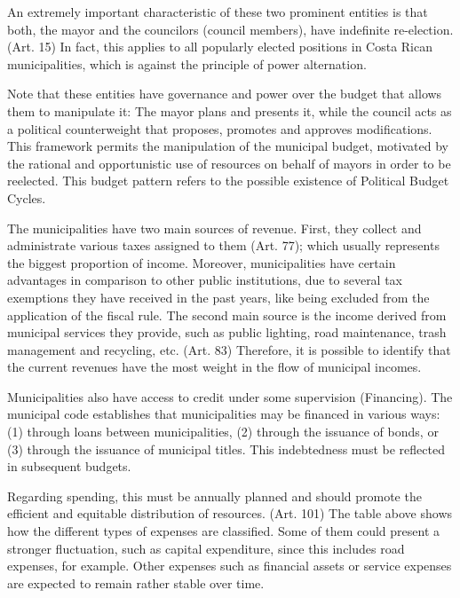 An extremely important characteristic of these two prominent entities is that both, the mayor and the councilors (council members), have indefinite re-election. (Art. 15) In fact, this applies to all popularly elected positions in Costa Rican municipalities, which is against the principle of power alternation. 

Note that these entities have governance and power over the budget that allows them to manipulate it: The mayor plans and presents it, while the council acts as a political counterweight that proposes, promotes and approves modifications. This framework permits the manipulation of the municipal budget, motivated by the rational and opportunistic use of resources on behalf of mayors in order to be reelected. This budget pattern refers to the possible existence of Political Budget Cycles.


The municipalities have two main sources of revenue. First, they collect and administrate various taxes assigned to them (Art. 77); which usually represents the biggest proportion of income. Moreover, municipalities have certain advantages in comparison to other public institutions, due to several tax exemptions they have received in the past years, like being excluded from the application of the fiscal rule. The second main source is the income derived from municipal services they provide, such as public lighting, road maintenance, trash management and recycling, etc. (Art. 83) Therefore, it is possible to identify that the current revenues have the most weight in the flow of municipal incomes.

Municipalities also have access to credit under some supervision (Financing). The municipal code establishes that municipalities may be financed in various ways: (1) through loans between municipalities, (2) through the issuance of bonds, or (3) through the issuance of municipal titles. This indebtedness must be reflected in subsequent budgets.

Regarding spending, this must be annually planned and should promote the efficient and equitable distribution of resources. (Art. 101) The table above shows how the different types of expenses are classified. Some of them could present a stronger fluctuation, such as capital expenditure, since this includes road expenses, for example. Other expenses such as financial assets or service expenses are expected to remain rather stable over time.

